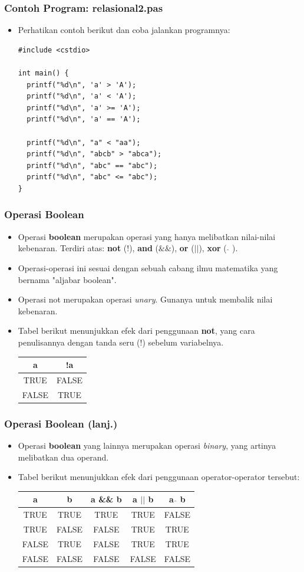 \begin{frame}[fragile]
\frametitle{Contoh Program: relasional2.pas}
\begin{itemize}
  \item Perhatikan contoh berikut dan coba jalankan programnya:
\begin{lstlisting}
#include <cstdio>

int main() {
  printf("%d\n", 'a' > 'A');
  printf("%d\n", 'a' < 'A');
  printf("%d\n", 'a' >= 'A');
  printf("%d\n", 'a' == 'A');

  printf("%d\n", "a" < "aa");
  printf("%d\n", "abcb" > "abca");
  printf("%d\n", "abc" == "abc");
  printf("%d\n", "abc" <= "abc");
}
\end{lstlisting}
\end{itemize}
\end{frame}

\begin{frame}
\frametitle{Operasi Boolean}
\begin{itemize}
  \item Operasi \textbf{boolean} merupakan operasi yang hanya melibatkan nilai-nilai kebenaran. Terdiri atas: \textbf{not} (!), \textbf{and} ($\&\&$), \textbf{or} ($||$), \textbf{xor} ( $\widehat{}$ ).
  \item Operasi-operasi ini sesuai dengan sebuah cabang ilmu matematika yang bernama "aljabar boolean".
  \item Operasi \alert{not} merupakan operasi \textit{unary}. Gunanya untuk membalik nilai kebenaran.
  \item Tabel berikut menunjukkan efek dari penggunaan \textbf{not}, yang cara penulisannya dengan tanda seru (!) sebelum variabelnya.
  \begin{tabular}{|c|c|}
  \hline a & !a \\
  \hline TRUE & FALSE \\
  \hline FALSE & TRUE \\
  \hline
  \end{tabular}
\end{itemize}
\end{frame}

\begin{frame}
\frametitle{Operasi Boolean (lanj.)}
\begin{itemize}
  \item Operasi \textbf{boolean} yang lainnya merupakan operasi \textit{binary}, yang artinya melibatkan dua operand.
  \item Tabel berikut menunjukkan efek dari penggunaan operator-operator tersebut:
  \begin{tabular}{|c|c|c|c|c|}
  \hline a & b & a \&\& b & a $||$ b & a $\widehat{}$ b \\
  \hline TRUE & TRUE & TRUE & TRUE & FALSE \\
  \hline TRUE & FALSE & FALSE & TRUE & TRUE \\
  \hline FALSE & TRUE & FALSE & TRUE & TRUE\\
  \hline FALSE & FALSE & FALSE & FALSE & FALSE \\
  \hline
  \end{tabular}
\end{itemize}
\end{frame}

